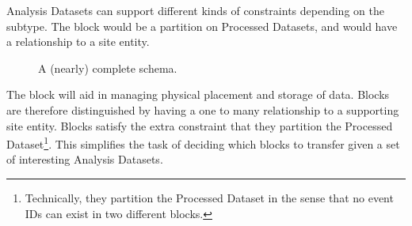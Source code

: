 \documentclass{cmspaper}
\begin{document}
Analysis Datasets can support different kinds of constraints depending on the 
subtype.  The block would be a partition on Processed Datasets, and would have a 
relationship to a site entity.  
\begin{figure}[hbtp]
  \begin{center}
    \caption{A (nearly) complete schema.}
    \label{fig:detailed}
  \end{center}
\end{figure}
The block will aid in managing physical placement and storage of data.  
Blocks are therefore distinguished by having a one to many relationship to a supporting site 
entity.  Blocks satisfy the extra constraint that they  
partition the Processed Dataset\footnote{Technically, they partition the 
Processed Dataset in the sense that no event IDs
can exist in two different blocks.}.  This  simplifies the task of deciding which 
blocks to transfer given a set of interesting Analysis Datasets.
\end{document}

